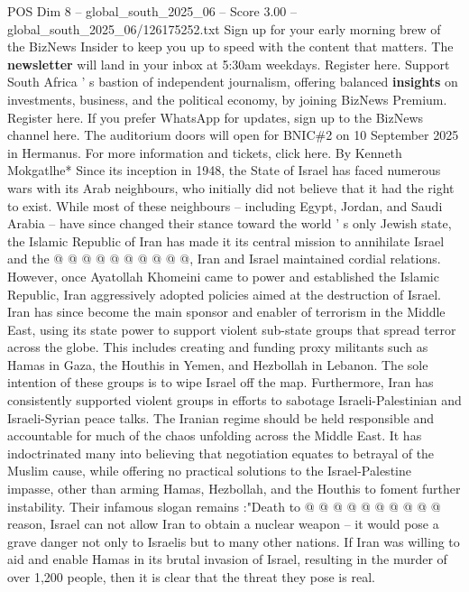 \begin{textsample}{POS Dim 8 – global\_south\_2025\_06 – Score 3.00 – global\_south\_2025\_06/126175252.txt}  \label{ex:f8_pos_200}
Sign up for your early morning brew of the BizNews Insider to keep you up to speed with the content that matters.
The \textbf{newsletter} will land in your inbox at 5:30am weekdays.
Register here.
Support South Africa ' s bastion of independent journalism, offering balanced \textbf{insights} on investments, business, and the political economy, by joining BizNews Premium.
Register here.
If you prefer WhatsApp for updates, sign up to the BizNews channel here.
The auditorium doors will open for BNIC\#2 on 10 September 2025 in Hermanus.
For more information and tickets, click here.
By Kenneth Mokgatlhe* Since its inception in 1948, the State of Israel has faced numerous wars with its Arab neighbours, who initially did not believe that it had the right to exist.
While most of these neighbours -- including Egypt, Jordan, and Saudi Arabia -- have since changed their stance toward the world ' s only Jewish state, the Islamic Republic of Iran has made it its central mission to annihilate Israel and the @ @ @ @ @ @ @ @ @ @, Iran and Israel maintained cordial relations.
However, once Ayatollah Khomeini came to power and established the Islamic Republic, Iran aggressively adopted policies aimed at the destruction of Israel.
Iran has since become the main sponsor and enabler of terrorism in the Middle East, using its state power to support violent sub-state groups that spread terror across the globe.
This includes creating and funding proxy militants such as Hamas in Gaza, the Houthis in Yemen, and Hezbollah in Lebanon.
The sole intention of these groups is to wipe Israel off the map.
Furthermore, Iran has consistently supported violent groups in efforts to sabotage Israeli-Palestinian and Israeli-Syrian peace talks.
The Iranian regime should be held responsible and accountable for much of the chaos unfolding across the Middle East.
It has indoctrinated many into believing that negotiation equates to betrayal of the Muslim cause, while offering no practical solutions to the Israel-Palestine impasse, other than arming Hamas, Hezbollah, and the Houthis to foment further instability.
Their infamous slogan remains :"Death to @ @ @ @ @ @ @ @ @ @ reason, Israel can not allow Iran to obtain a nuclear weapon -- it would pose a grave danger not only to Israelis but to many other nations.
If Iran was willing to aid and enable Hamas in its brutal invasion of Israel, resulting in the murder of over 1,200 people, then it is clear that the threat they pose is real.

\end{textsample}
